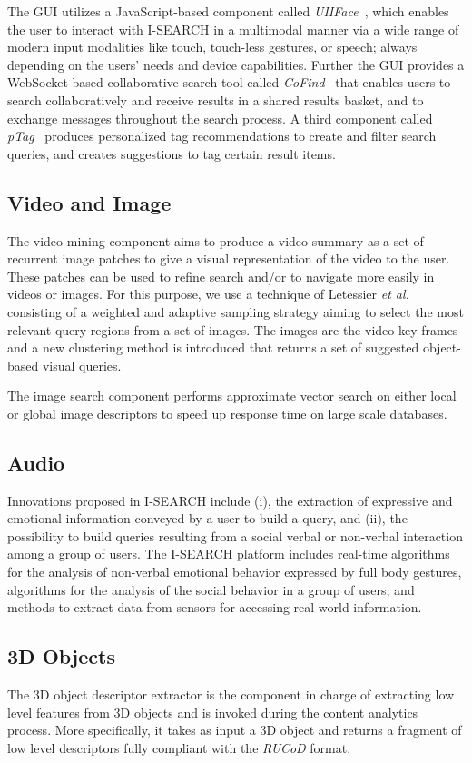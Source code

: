 \documentclass{acm_proc_article-sp}
\let\oldemph\emph
\renewcommand{\emph}[1]{\oldemph{\fontsize{9}{9}\selectfont #1}}
\begin{document}
The GUI utilizes a JavaScript-based component called \emph{UIIFace}~\cite{mmm2012}, which enables the user to interact with \mbox{I-SEARCH} in a multimodal manner via a wide range of modern input modalities like touch, touch-less gestures, or speech; always depending on the users' needs and device capabilities.
Further the GUI provides a WebSocket-based collaborative search tool called \emph{CoFind}~\cite{mmm2012} that enables users to search collaboratively and receive results in a shared results basket, and to exchange messages throughout the search process.
A third component called \emph{pTag}~\cite{mmm2012} produces personalized tag recommendations to create and filter search queries, and creates suggestions to tag certain result items.

\subsection{Video and Image}
The video mining component aims to produce a video summary as a set of recurrent image patches to give a visual representation of the video to the user.
These patches can be used to refine search and/or to navigate more easily in videos or images.
For this purpose, we use a technique of Letessier \textit{et al.}~\cite{Letessier11} consisting of a weighted and adaptive sampling strategy aiming to select the most relevant query regions from a set of images.
The images are the video key frames and a new clustering method is introduced that returns a set of suggested object-based visual queries.

The image search component performs approximate vector search on either local or global image descriptors to speed up response time on large scale databases.

\subsection{Audio}
Innovations proposed in \mbox{I-SEARCH} include (i), the extraction of expressive and emotional information conveyed by a user to build a query, and (ii), the possibility to build queries resulting from a social verbal or non-verbal interaction among a group of users.
The I-SEARCH platform includes real-time algorithms for the analysis of non-verbal emotional behavior expressed by full body gestures, algorithms for the analysis of the social behavior in a group of users, and  methods to extract data from sensors for accessing real-world information.

\subsection{3D Objects}
The 3D object descriptor extractor is the component in charge of extracting low level features from 3D objects and is invoked during the content analytics process.
More specifically, it takes as input a 3D object and returns a fragment of low level descriptors fully compliant with the \emph{RUCoD} format.
\end{document}
